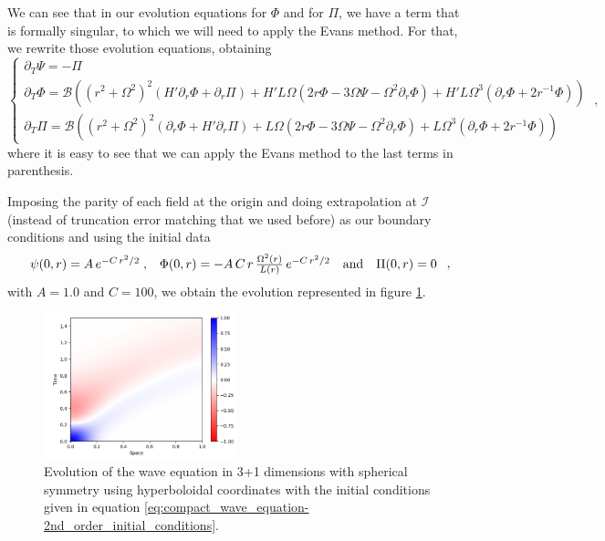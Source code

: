 We can see that in our evolution equations for $\Phi$ and for $\Pi$, we have a term that is formally singular, to which we will need to apply the Evans method. For that, we rewrite those evolution equations, obtaining
\begin{equation}
    \left\{ \begin{array}{l} 
        \partial_T \Psi = - \Pi \\ 
        \partial_T \Phi = \mathcal{B}\left((r^2 + \Omega^2)^2 \left(H' \partial_r \Phi + \partial_r\Pi\right) + H' L \Omega \left( 2r\Phi - 3 \Omega \Psi - \Omega^2 \partial_r \Phi\right) + H' L\Omega^3\left( \partial_r \Phi + 2 r^{-1}\Phi\right) \right)\\
        \partial_T \Pi = \mathcal{B}\left((r^2 + \Omega^2)^2 \left(\partial_r \Phi + H' \partial_r\Pi\right) + L \Omega \left( 2r\Phi - 3 \Omega \Psi - \Omega^2 \partial_r\Phi \right) + L \Omega^3\left( \partial_r \Phi + 2 r^{-1}\Phi \right) \right)
    \end{array} \right. \; ,
\end{equation}
%
where it is easy to see that we can apply the Evans method to the last terms in parenthesis.

Imposing the parity of each field at the origin and doing extrapolation at $\mathscr{I}$ (instead of truncation error matching that we used before) as our boundary conditions and using the initial data
\begin{equation}
    \begin{array}{c c c c}
        \psi(0,r) = A \, e^{-C \, r^2/2} \; , & \Phi(0,r) = - A \,C \, r \, \frac{\Omega^2(r)}{L(r)} \, e^{-C \, r^2/2} & \text{and} & \Pi(0,r) = 0
        \end{array} \; ,
\end{equation}
with $A = 1.0$ and $C = 100$, we obtain the evolution represented in figure \ref{fig:spherical_compact_wave_equation-2nd_order}.

\begin{figure}[h]
    \centering
    \includegraphics[width=0.5\textwidth]{Images/Wave_Equation_3+1_Spherical-Solution.png}
    \caption{Evolution of the wave equation in 3+1 dimensions with spherical symmetry using hyperboloidal coordinates with the initial conditions given in equation \eqref{eq:compact_wave_equation-2nd_order_initial_conditions}.}
    \label{fig:spherical_compact_wave_equation-2nd_order}
\end{figure}

